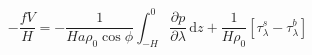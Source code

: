 \begin{equation}
    -\frac{fV}{H} = -\frac{1}{Ha\rho_0\cos\phi}\int_{-H}^0\frac{\partial p}{\partial\lambda} \, \text{d}z + \frac{1}{H\rho_0}\left[\tau_\lambda^s-\tau_\lambda^b\right]
\label{EQN:VAvU}
\end{equation}

